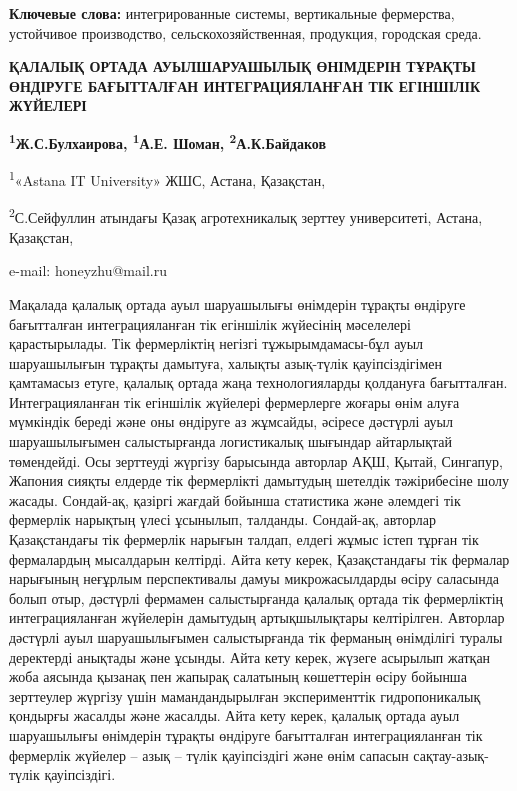 {\bfseries Ключевые слова:} интегрированные системы, вертикальные
фермерства, устойчивое производство, сельскохозяйственная, продукция,
городская среда.

\begin{articleheader}
{\bfseries ҚАЛАЛЫҚ ОРТАДА АУЫЛШАРУАШЫЛЫҚ ӨНІМДЕРІН ТҰРАҚТЫ ӨНДІРУГЕ БАҒЫТТАЛҒАН ИНТЕГРАЦИЯЛАНҒАН ТІК ЕГІНШІЛІК ЖҮЙЕЛЕРІ}

{\bfseries
\textsuperscript{1}Ж.С.Булхаирова\textsuperscript{\envelope },
\textsuperscript{1}А.Е. Шоман,
\textsuperscript{2}А.К.Байдаков
}
\end{articleheader}

\begin{affiliation}
\textsuperscript{1}«Astana IT University» ЖШС, Астана, Қазақстан,

\textsuperscript{2}С.Сейфуллин атындағы Қазақ агротехникалық зерттеу университеті, Астана, Қазақстан,

e-mail: honeyzhu@mail.ru
\end{affiliation}

Мақалада қалалық ортада ауыл шаруашылығы өнімдерін тұрақты өндіруге
бағытталған интеграцияланған тік егіншілік жүйесінің мәселелері
қарастырылады. Тік фермерліктің негізгі тұжырымда\-масы-бұл ауыл
шаруашылығын тұрақты дамытуға, халықты азық-түлік қауіпсіздігімен
қамтамасыз етуге, қалалық ортада жаңа технологияларды қолдануға
бағытталған. Интеграцияланған тік егіншілік жүйелері фермерлерге жоғары
өнім алуға мүмкіндік береді және оны өндіруге аз жұмсайды, әсіресе
дәстүрлі ауыл шаруашылығымен салыстырғанда логистикалық шығындар
айтарлықтай төмендейді. Осы зерттеуді жүргізу барысында авторлар АҚШ,
Қытай, Сингапур, Жапония сияқты елдерде тік фермерлікті дамытудың
шетелдік тәжірибесіне шолу жасады. Сондай-ақ, қазіргі жағдай бойынша
статистика және әлемдегі тік фермерлік нарықтың үлесі ұсынылып,
талданды. Сондай-ақ, авторлар Қазақстандағы тік фермерлік нарығын
талдап, елдегі жұмыс істеп тұрған тік фермалардың мысалдарын келтірді.
Айта кету керек, Қазақстандағы тік фермалар нарығының неғұрлым
перспективалы дамуы микрожасылдарды өсіру саласында болып отыр, дәстүрлі
фермамен салыстырғанда қалалық ортада тік фермерліктің интеграцияланған
жүйелерін дамытудың артықшылықтары келтірілген. Авторлар дәстүрлі ауыл
шаруашылығымен салыстырғанда тік ферманың өнімділігі туралы деректерді
анықтады және ұсынды. Айта кету керек, жүзеге асырылып жатқан жоба
аясында қызанақ пен жапырақ салатының көшеттерін өсіру бойынша
зерттеулер жүргізу үшін мамандандырылған эксперименттік гидропоникалық
қондырғы жасалды және жасалды. Айта кету керек, қалалық ортада ауыл
шаруашылығы өнімдерін тұрақты өндіруге бағытталған интеграцияланған тік
фермерлік жүйелер -- азық -- түлік қауіпсіздігі және өнім сапасын
сақтау-азық-түлік қауіпсіздігі.

